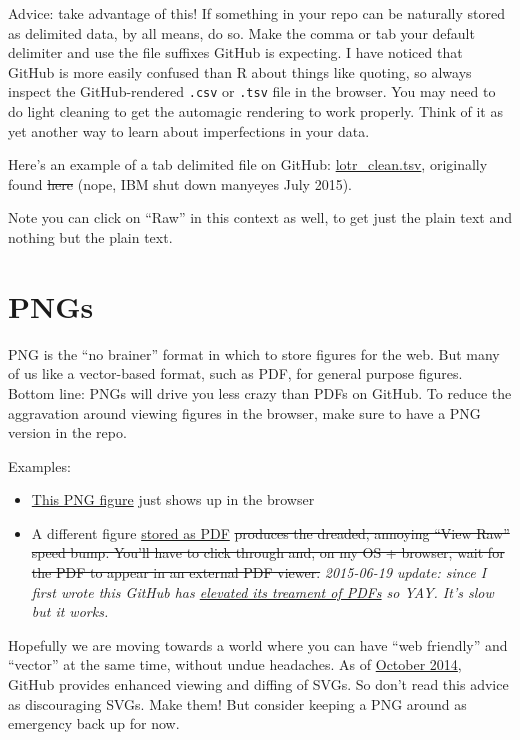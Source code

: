 \documentclass[
]{book}
\providecommand{\tightlist}{%
  \setlength{\itemsep}{0pt}\setlength{\parskip}{0pt}}
\begin{document}
Advice: take advantage of this! If something in your repo can be naturally stored as delimited data, by all means, do so. Make the comma or tab your default delimiter and use the file suffixes GitHub is expecting. I have noticed that GitHub is more easily confused than R about things like quoting, so always inspect the GitHub-rendered \texttt{.csv} or \texttt{.tsv} file in the browser. You may need to do light cleaning to get the automagic rendering to work properly. Think of it as yet another way to learn about imperfections in your data.

Here's an example of a tab delimited file on GitHub: \href{https://github.com/jennybc/lotr/blob/master/lotr_clean.tsv}{lotr\_clean.tsv}, originally found \st{here} (nope, IBM shut down manyeyes July 2015).

Note you can click on ``Raw'' in this context as well, to get just the plain text and nothing but the plain text.

\section{PNGs}\label{pngs}

PNG is the ``no brainer'' format in which to store figures for the web. But many of us like a vector-based format, such as PDF, for general purpose figures. Bottom line: PNGs will drive you less crazy than PDFs on GitHub. To reduce the aggravation around viewing figures in the browser, make sure to have a PNG version in the repo.

Examples:

\begin{itemize}
\tightlist
\item
  \href{https://github.com/jennybc/STAT545A/blob/master/hw06_scaffolds/01_justR/stripplot_wordsByRace_The_Fellowship_Of_The_Ring.png}{This PNG figure} just shows up in the browser
\item
  A different figure \href{https://github.com/jennybc/ggplot2-tutorial/blob/master/gapminder-country-colors.pdf}{stored as PDF} \st{produces the dreaded, annoying ``View Raw'' speed bump. You'll have to click through and, on my OS + browser, wait for the PDF to appear in an external PDF viewer.} \emph{2015-06-19 update: since I first wrote this GitHub has \href{https://github.com/blog/1974-pdf-viewing}{elevated its treament of PDFs} so YAY. It's slow but it works.}
\end{itemize}

Hopefully we are moving towards a world where you can have ``web friendly'' and ``vector'' at the same time, without undue headaches. As of \href{https://github.com/blog/1902-svg-viewing-diffing}{October 2014}, GitHub provides enhanced viewing and diffing of SVGs. So don't read this advice as discouraging SVGs. Make them! But consider keeping a PNG around as emergency back up for now.
\end{document}
